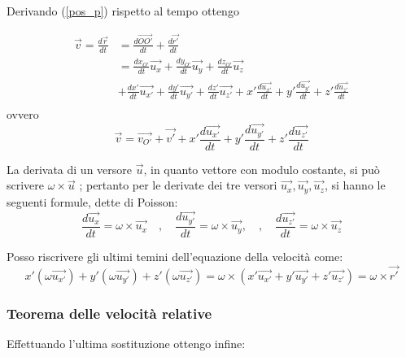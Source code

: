 \documentclass[class=book, crop=false, oneside, 12pt]{standalone}
\begin{document}
Derivando (\ref{pos_p}) rispetto al tempo ottengo

\begin{align*}
    \overrightarrow{v} = \frac{d \overrightarrow{r}}{dt} & = \frac{d \overrightarrow{OO'}}{d t} + \frac{d \overrightarrow{r'}}{dt} \\
    & = \frac{d x_{O'}}{d t} \overrightarrow{u_{x}}+\frac{d y_{O'}}{d t} \overrightarrow{u_{y}}+\frac{d z_{O'}}{d t} \overrightarrow{u_{z}}\\
        &+\frac{dx'}{dt} \overrightarrow{u_{x'}} + \frac{dy'}{dt} \overrightarrow{u_{y'}} + \frac{dz'}{dt} \overrightarrow{u_{z'}} + x' \frac{d\overrightarrow{u_{x'}}}{dt}  + y' \frac{d\overrightarrow{u_{y'}}}{dt}  + z' \frac{d\overrightarrow{u_{z'}}}{dt}\\
\end{align*}
ovvero
\begin{equation}
    \overrightarrow{v} = \overrightarrow{v_{O'}} + \overrightarrow{v'} + x' \frac{d\overrightarrow{u_{x'}}}{dt}  + y' \frac{d\overrightarrow{u_{y'}}}{dt}  + z' \frac{d\overrightarrow{u_{z'}}}{dt}
\end{equation}

La derivata di un versore \(\overrightarrow{u}\), in quanto vettore con modulo costante, si può scrivere \(\omega \times \overrightarrow{u}\) ; pertanto per le derivate dei tre versori \(\overrightarrow{u_x},\overrightarrow{u_y},\overrightarrow{u_z}\), si hanno le seguenti formule, dette di Poisson:
\begin{equation}
    \frac{d \overrightarrow{u_{x}}}{d t}=\omega \times \overrightarrow{u_{x}} \quad, \quad \frac{d \overrightarrow{u_{y'}}}{d t}=\omega \times \overrightarrow{u_{y}}, \quad, \quad \frac{d \overrightarrow{u_{z'}}}{d t}=\omega \times \overrightarrow{u_{z}}
\end{equation} 

Posso riscrivere gli ultimi temini dell'equazione della velocità come:
\begin{equation}
    x' (\omega \overrightarrow{u_{x'}}) + y' (\omega \overrightarrow{u_{y'}}) + z' (\omega \overrightarrow{u_{z'}}) = \omega \times (x' \overrightarrow{u_{x'}} + y' \overrightarrow{u_{y'}} + z' \overrightarrow{u_{z'}}) = \omega \times \overrightarrow{r'}
\end{equation}

\subsubsection{Teorema delle velocità relative}
Effettuando l'ultima sostituzione ottengo infine:
\end{document}
